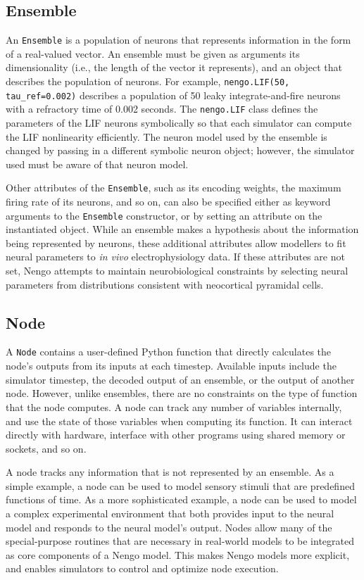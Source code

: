 \documentclass{frontiersSCNS}
\begin{document}
\subsection{Ensemble}

An \texttt{Ensemble} is
a population of neurons
that represents information
in the form of a real-valued vector.
An ensemble must be given as arguments
its dimensionality
(i.e., the length of the vector it represents),
and an object that describes
the population of neurons.
For example, \texttt{nengo.LIF(50, tau\_ref=0.002)}
describes a population
of 50 leaky integrate-and-fire neurons \cite{TODO} %
with a refractory time of 0.002 seconds.
The \texttt{nengo.LIF} class defines
the parameters of the LIF neurons symbolically
so that each simulator can compute
the LIF nonlinearity efficiently.
The neuron model used by the ensemble
is changed by passing in a different symbolic neuron object;
however, the simulator used must be aware
of that neuron model.

Other attributes of the \texttt{Ensemble},
such as its encoding weights,
the maximum firing rate of its neurons,
and so on, can also be specified
either as keyword arguments
to the \texttt{Ensemble} constructor,
or by setting an attribute on the instantiated object.
While an ensemble makes a hypothesis
about the information being represented by neurons,
these additional attributes
allow modellers to fit
neural parameters to \textit{in vivo}
electrophysiology data.
If these attributes are not set,
Nengo attempts to maintain
neurobiological constraints
by selecting neural parameters
from distributions consistent with
neocortical pyramidal cells.

\subsection{Node}

A \texttt{Node} contains a user-defined
Python function that directly calculates
the node's outputs from its inputs at each timestep.
Available inputs include
the simulator timestep,
the decoded output of an ensemble,
or the output of another node.
However, unlike ensembles,
there are no constraints on the type
of function that the node computes.
A node can track any number of variables internally,
and use the state of those variables
when computing its function.
It can interact directly with hardware,
interface with other programs
using shared memory or sockets,
and so on.

A node tracks any information
that is not represented by an ensemble.
As a simple example,
a node can be used to model sensory stimuli
that are predefined functions of time.
As a more sophisticated example,
a node can be used to model
a complex experimental environment that
both provides input to the neural model
and responds to the neural model's output.
Nodes allow many of the special-purpose
routines that are necessary in real-world
models to be integrated
as core components of a Nengo model.
This makes Nengo models more explicit,
and enables simulators
to control and optimize node execution.
\end{document}
